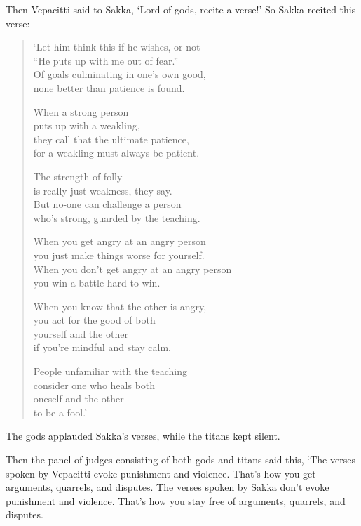 \documentclass[12pt,openany]{book}%
\begin{document}
Then Vepacitti said to Sakka, ‘Lord of gods, recite a verse!’ So Sakka recited this verse: 

\begin{verse}%
‘Let him think this if he wishes, or not—\\
“He puts up with me out of fear.” \\
Of goals culminating in one’s own good, \\
none better than patience is found. 

When a strong person \\
puts up with a weakling, \\
they call that the ultimate patience, \\
for a weakling must always be patient. 

The strength of folly \\
is really just weakness, they say. \\
But no-one can challenge a person \\
who’s strong, guarded by the teaching. 

When you get angry at an angry person \\
you just make things worse for yourself. \\
When you don’t get angry at an angry person \\
you win a battle hard to win. 

When you know that the other is angry, \\
you act for the good of both \\
yourself and the other \\
if you’re mindful and stay calm. 

People unfamiliar with the teaching \\
consider one who heals both \\
oneself and the other \\
to be a fool.’ 

%
\end{verse}

The gods applauded Sakka’s verses, while the titans kept silent. 

Then the panel of judges consisting of both gods and titans said this, ‘The verses spoken by Vepacitti evoke punishment and violence. That’s how you get arguments, quarrels, and disputes. The verses spoken by Sakka don’t evoke punishment and violence. That’s how you stay free of arguments, quarrels, and disputes. 
\end{document}
